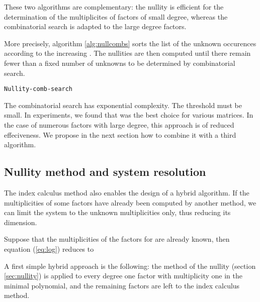 \documentclass{article}
\begin{document}
These two algorithms are complementary: the nullity is efficient for the
determination of the multiplicites of factors of small degree, whereas the
combinatorial search is adapted to the large degree factors.

More precisely, algorithm \ref{alg:nullcombs} sorts the list of the unknown occurences
 according to the increasing . The nullities are then computed
until there remain fewer than a fixed number  of unknowns to be determined by 
combinatorial search.

\newcommand{\nullcomb}{\texttt{Nullity-comb-search}}


\begin{algorithm}
  \dontprintsemicolon
  \caption{\nullcomb}
  \label{alg:nullcombs}
\end{algorithm}
The combinatorial search has exponential complexity. The threshold
 must be small. In experiments, we found that  was the best choice for
various matrices.
In the case of numerous factors with large degree, this approach is of reduced effeciveness. We propose in the next section how to combine it with a third algorithm.


\subsection{Nullity method and system resolution} \label{sec:improv}

The index calculus method also enables the design of a hybrid
algorithm. If the multiplicities of some factors have already been computed by
another method, we can limit the system to the unknown multiplicities only, thus
reducing its dimension.  

Suppose that the multiplicities  of the factors
 for  are already known, then equation (\ref{eq:log}) reduces to 
{\small

}

A first simple hybrid approach is the following: the method of
the nullity  (section \ref{sec:nullity}) is applied to every degree one factor
with multiplicity one in the minimal polynomial, and the remaining factors 
are left to the index calculus method.
\end{document}
